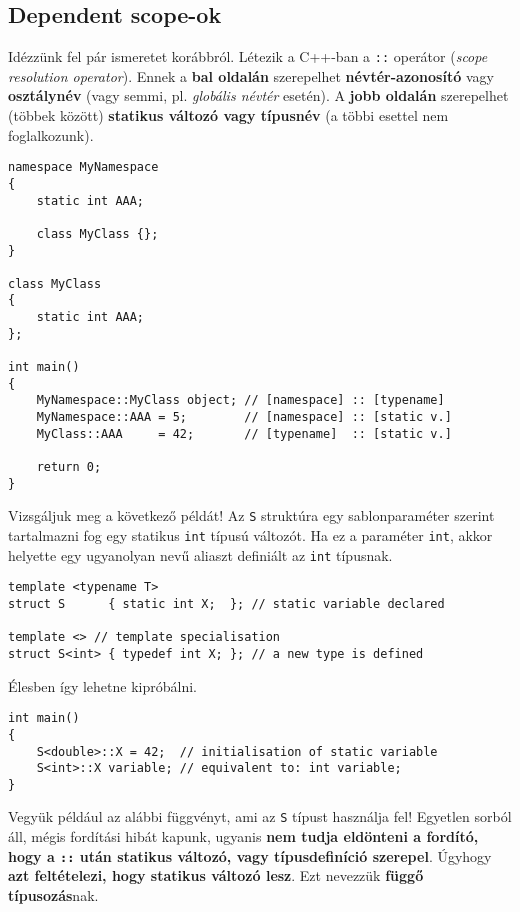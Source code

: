 \documentclass[a4paper, 11pt, oneside]{book}
\begin{document}
\subsection{Dependent scope-ok}

Idézzünk fel pár ismeretet korábbról. Létezik a C++-ban a \verb*|::| operátor (\textit{scope resolution operator}). Ennek a \textbf{bal oldalán} szerepelhet \textbf{névtér-azonosító} vagy \textbf{osztálynév} (vagy semmi, pl. \textit{globális névtér} esetén). A \textbf{jobb oldalán} szerepelhet (többek között) \textbf{statikus változó vagy típusnév} (a többi esettel nem foglalkozunk).

\begin{lstlisting}[style=cppstyle]
namespace MyNamespace 
{
	static int AAA;
	
	class MyClass {};
}

class MyClass 
{
	static int AAA;
};

int main() 
{
	MyNamespace::MyClass object; // [namespace] :: [typename]
	MyNamespace::AAA = 5;		 // [namespace] :: [static v.]	
	MyClass::AAA 	 = 42;		 // [typename]  :: [static v.]
	
	return 0;
}
\end{lstlisting}

Vizsgáljuk meg a következő példát! Az \verb*|S| struktúra egy sablonparaméter szerint tartalmazni fog egy statikus \verb*|int| típusú változót. Ha ez a paraméter \verb*|int|, akkor helyette egy ugyanolyan nevű aliaszt definiált az \verb*|int| típusnak.

\begin{lstlisting}[style=cppstyle]
template <typename T>
struct S      { static int X;  }; // static variable declared

template <>	// template specialisation
struct S<int> { typedef int X; }; // a new type is defined
\end{lstlisting}

Élesben így lehetne kipróbálni.

\begin{lstlisting}[style=cppstyle]
int main()
{
	S<double>::X = 42;	// initialisation of static variable
	S<int>::X variable;	// equivalent to: int variable;
}
\end{lstlisting}

Vegyük például az alábbi függvényt, ami az \verb*|S| típust használja fel! Egyetlen sorból áll, mégis fordítási hibát kapunk, ugyanis \textbf{nem tudja eldönteni a fordító, hogy a \texttt{::} után statikus változó, vagy típusdefiníció szerepel}. Úgyhogy \textbf{azt feltételezi, hogy statikus változó lesz}. Ezt nevezzük \textbf{függő típusozás}nak.
\end{document}
